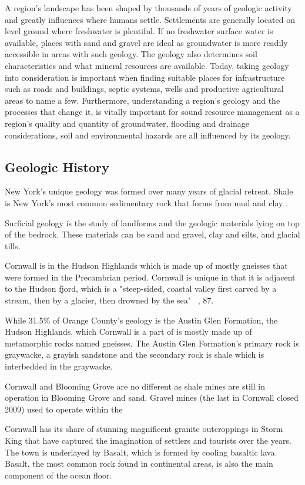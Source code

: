 A region's landscape has been shaped by thousands of years of geologic activity and greatly influences where humans settle. Settlements are generally located on level ground where freshwater is plentiful. If no freshwater surface water is available, places with sand and gravel are ideal as groundwater is more readily accessible in areas with such geology. The geology also determines soil characteristics and what mineral resources are available. Today, taking geology into consideration is important when finding suitable places for infrastructure such as roads and buildings, septic systems, wells and productive agricultural areas to name a few. Furthermore, understanding a region's geology and the processes that change it, is vitally important for sound resource management as a region's quality and quantity of groundwater, flooding and drainage considerations, soil and environmental hazards are all influenced by its geology.

\subsection{Geologic History}
New York's unique geology was formed over many years of glacial retreat. Shale is New York's most common sedimentary rock that forms from mud and clay \cite{vandiver}.

Surficial geology is the study of landforms and the geologic 
materials lying on top of the bedrock. These materials can be sand and gravel, clay and silts, and glacial tills.

Cornwall is in the Hudson Highlands which is made up of mostly gneisses that were formed in the Precambrian period. Cornwall is unique in that it is adjacent to the Hudson fjord, which is a "steep-sided, coastal valley first carved by a stream, then by a glacier, then drowned by the sea" ~\citep{vandiver}, 87.

While 31.5\% of Orange County's geology is the Austin Glen Formation, the Hudson Highlands, which Cornwall is a part of is mostly made up of metamorphic rocks named gneisses. The Austin Glen Formation's primary rock is graywacke, a grayish sandstone and the secondary rock is shale which is interbedded in the graywacke.

Cornwall and Blooming Grove are no 
different as shale mines are still in operation in Blooming Grove and 
sand. Gravel mines (the last in Cornwall closed 2009) used to operate within the 

Cornwall has its share of stunning magnificent granite outcroppings in Storm King that have captured the imagination of settlers and tourists over the years. The town is underlayed by Basalt, which is formed by cooling basaltic lava. Basalt, the most common rock found in continental areas, is also the main component of the ocean floor. 

